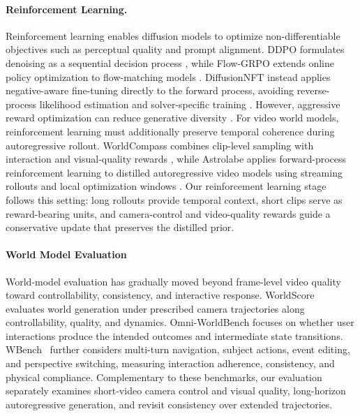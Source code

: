 \documentclass{llmxive}
\begin{document}
\paragraph{\bf{Reinforcement Learning.}}
Reinforcement learning enables diffusion models to optimize non-differentiable
objectives such as perceptual quality and prompt alignment. DDPO formulates
denoising as a sequential decision process \citep{black2023ddpo}, while
Flow-GRPO extends online policy optimization to flow-matching models
\citep{liu2025flowgrpo}. DiffusionNFT instead applies negative-aware
fine-tuning directly to the forward process, avoiding reverse-process likelihood
estimation and solver-specific training \citep{zheng2025diffusionnft}.
However, aggressive reward optimization can reduce generative diversity
\citep{chen2025taming}.
For video world models, reinforcement learning must additionally preserve
temporal coherence during autoregressive rollout. WorldCompass combines
clip-level sampling with interaction and visual-quality rewards
\citep{wang2026worldcompass}, while Astrolabe applies forward-process
reinforcement learning to distilled autoregressive video models using streaming
rollouts and local optimization windows \citep{zhang2026astrolabe}.
Our reinforcement learning stage follows this setting: long rollouts provide temporal
context, short clips serve as reward-bearing units, and camera-control and
video-quality rewards guide a conservative update that preserves the distilled
prior.

\paragraph{\bf{World Model Evaluation}} 
World-model evaluation has gradually moved beyond frame-level video quality~\citep{chen2025finger, ling2025vmbench}
toward controllability, consistency, and interactive response. WorldScore~\citep{duan2025worldscore}
evaluates world generation under prescribed camera trajectories along
controllability, quality, and dynamics. Omni-WorldBench\citep{wu2026omniworldbench} focuses on whether user
interactions produce the intended outcomes and intermediate state transitions. WBench~\citep{ying2026wbenchcomprehensivemultiturnbenchmark} further considers multi-turn navigation, subject actions, event editing, and perspective switching, measuring interaction adherence, consistency, and physical compliance. Complementary to these benchmarks, our evaluation separately examines short-video camera control and visual quality, long-horizon autoregressive generation, and revisit consistency over extended trajectories.
\end{document}
